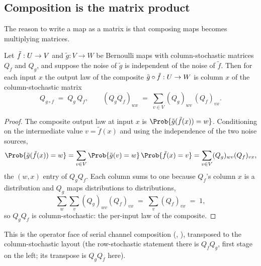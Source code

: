 \subsection*{Composition is the matrix product}

The reason to write a map as a matrix is that composing maps becomes
multiplying matrices.

\begin{proposition}
\label{prop:operator-map-composition}
Let $\tilde{f} : U \to V$ and $\tilde{g} : V \to W$ be Bernoulli maps
with column-stochastic matrices $Q_f$ and $Q_g$, and suppose the noise of
$\tilde{g}$ is independent of the noise of $\tilde{f}$. Then for each input $x$ the output law of the composite
$\tilde{g} \circ \tilde{f} : U \to W$ is column $x$ of the
column-stochastic matrix
\[
  Q_{g \circ f} \;=\; Q_g\, Q_f,
  \qquad
  (Q_g Q_f)_{wx} \;=\; \sum_{v \in V} (Q_g)_{wv}\, (Q_f)_{vx}.
\]
\end{proposition}

\begin{proof}
The composite output law at input $x$ is $\Prob{\tilde{g}(\tilde{f}(x)) = w}$.
Conditioning on the intermediate value $v = \tilde{f}(x)$ and using the
independence of the two noise sources,
\[
  \Prob{\tilde{g}(\tilde{f}(x)) = w}
  = \sum_{v \in V} \Prob{\tilde{g}(v) = w}\, \Prob{\tilde{f}(x) = v}
  = \sum_{v \in V} (Q_g)_{wv} (Q_f)_{vx},
\]
the $(w, x)$ entry of $Q_g Q_f$. Each column sums to one because $Q_f$'s column
$x$ is a distribution and $Q_g$ maps distributions to distributions,
\[
  \sum_w \sum_v (Q_g)_{wv}(Q_f)_{vx} \;=\; \sum_v (Q_f)_{vx} \;=\; 1,
\]
so $Q_g Q_f$ is column-stochastic: the per-input law of the composite.
\end{proof}

This is the operator face of serial channel composition
(, ), transposed
to the column-stochastic layout (the row-stochastic statement there is
$Q_f Q_g$, first stage on the left; its transpose is $Q_g Q_f$ here).

